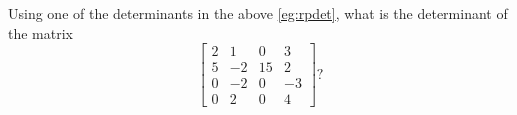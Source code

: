\begin{activity}
Using one of the determinants in the above \autoref{eg:rpdet}, what is the determinant of the matrix
\begin{equation*}
\begin{bmatrix} 2&1&0&3
\\5&-2&15&2
\\0&-2&0&-3
\\0&2&0&4 \end{bmatrix} ?
\end{equation*}
\end{activity}







